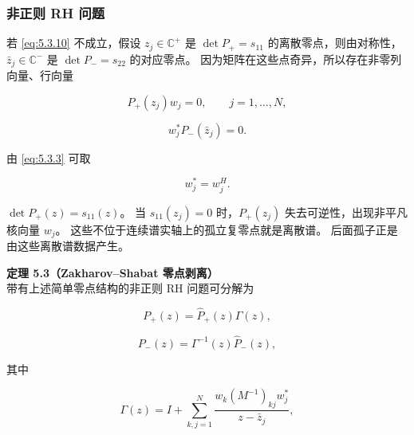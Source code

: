 \documentclass[
    lang=cn,
    scheme=chinese,
    mode=simple,
    device=normal,
    color=blue,
    math=cm,
    thmcnt=section,
    12pt,
    nowatermark
]{elegantbook}
\begin{document}
\subsubsection{非正则 RH 问题}

若 \eqref{eq:5.3.10} 不成立，假设 $z_j\in\mathbb{C}^+$ 是 $\det P_+=s_{11}$ 的离散零点，则由对称性，$\bar z_j\in\mathbb{C}^-$ 是 $\det P_-=s_{22}$ 的对应零点。
因为矩阵在这些点奇异，所以存在非零列向量、行向量

\begin{equation}
    P_+(z_j)w_j=0,
    \qquad j=1,\ldots,N,
    \tag{5.3.11}
    \label{eq:5.3.11}
\end{equation}

\begin{equation}
    w_j^*P_-(\bar z_j)=0.
    \tag{5.3.12}
    \label{eq:5.3.12}
\end{equation}

由 \eqref{eq:5.3.3} 可取

\begin{equation}
    w_j^*=w_j^H.
    \tag{5.3.13}
    \label{eq:5.3.13}
\end{equation}

\begin{callout}
    $\det P_+(z)=s_{11}(z)$。
    当 $s_{11}(z_j)=0$ 时，$P_+(z_j)$ 失去可逆性，出现非平凡核向量 $w_j$。
    这些不位于连续谱实轴上的孤立复零点就是离散谱。
    后面孤子正是由这些离散谱数据产生。
\end{callout}

\textbf{定理 5.3（Zakharov--Shabat 零点剥离）}\\
带有上述简单零点结构的非正则 RH 问题可分解为

\begin{equation}
    P_+(z)
    =
    \widehat P_+(z)\Gamma(z),
    \tag{5.3.14}
    \label{eq:5.3.14}
\end{equation}

\begin{equation}
    P_-(z)
    =
    \Gamma^{-1}(z)\widehat P_-(z),
    \tag{5.3.15}
    \label{eq:5.3.15}
\end{equation}

其中

\begin{equation}
    \Gamma(z)
    =
    I+
    \sum\limits_{k,j=1}^{N}
    \dfrac{
        w_k(M^{-1})_{kj}w_j^*
    }{
        z-\bar z_j
    },
    \tag{5.3.16}
    \label{eq:5.3.16}
\end{equation}
\end{document}
